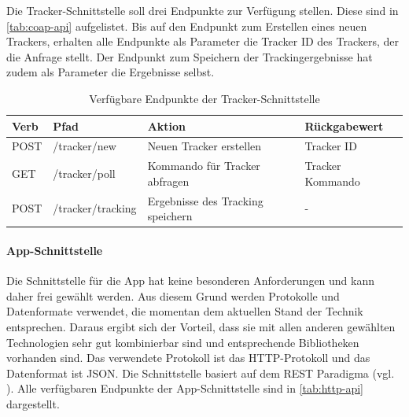 Die Tracker-Schnittstelle soll drei Endpunkte zur Verfügung stellen.
Diese sind in \autoref{tab:coap-api} aufgelistet.
Bis auf den Endpunkt zum Erstellen eines neuen Trackers, erhalten alle Endpunkte als Parameter die Tracker ID des Trackers, der die Anfrage stellt.
Der Endpunkt zum Speichern der Trackingergebnisse hat zudem als Parameter die Ergebnisse selbst.

\begin{table}[]
\begin{tabular}{l l l l}
\textbf{Verb} & \textbf{Pfad}     & \textbf{Aktion}                   & \textbf{Rückgabewert}    \\ \hline
POST          & /tracker/new      & Neuen Tracker erstellen           & Tracker ID \\ \hline
GET           & /tracker/poll     & Kommando für Tracker abfragen     & Tracker Kommando   \\ \hline
POST          & /tracker/tracking & Ergebnisse des Tracking speichern & -
\end{tabular}
\caption{\label{tab:coap-api}Verfügbare Endpunkte der Tracker-Schnittstelle}
\end{table}

\FloatBarrier
\paragraph{App-Schnittstelle} \label{par:app-schnittstelle}
Die Schnittstelle für die App hat keine besonderen Anforderungen und kann daher frei gewählt werden.
Aus diesem Grund werden Protokolle und Datenformate verwendet, die momentan dem aktuellen Stand der
Technik entsprechen. 
Daraus ergibt sich der Vorteil, dass sie mit allen anderen gewählten Technologien sehr gut
kombinierbar sind und entsprechende Bibliotheken vorhanden sind.
Das verwendete Protokoll ist das \gls{HTTP}-Protokoll und das Datenformat ist \gls{JSON}.
Die Schnittstelle basiert auf dem \gls{REST} Paradigma (vgl. \cite{Fielding2000}). 
Alle verfügbaren Endpunkte der App-Schnittstelle sind in \autoref{tab:http-api} dargestellt.

